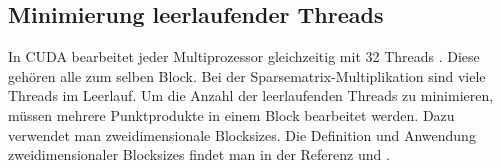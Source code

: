 \subsection{Minimierung leerlaufender Threads}

In CUDA bearbeitet jeder Multiprozessor gleichzeitig mit 32 Threads \cite{cudapg}.
Diese gehören alle zum selben Block.
Bei der Sparsematrix-Multiplikation sind viele Threads im Leerlauf.
Um die Anzahl der leerlaufenden Threads zu minimieren,
müssen mehrere Punktprodukte in einem Block bearbeitet werden.
Dazu verwendet man zweidimensionale Blocksizes.
Die Definition und Anwendung zweidimensionaler Blocksizes findet man in der Referenz\cite{cudapg} und \cite{cudbp}.

